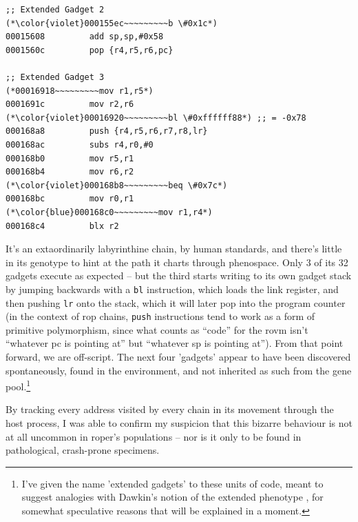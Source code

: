 \documentclass[12pt,glossary]{dalthesis}
\begin{document}
\begin{table}
\begin{multicols}{2}
\begin{lstlisting}[basicstyle=\scriptsize\ttfamily]
;; Extended Gadget 2 
(*\color{violet}000155ec~~~~~~~~~b \#0x1c*)
00015608         add sp,sp,#0x58 
0001560c         pop {r4,r5,r6,pc}

;; Extended Gadget 3 
(*00016918~~~~~~~~~mov r1,r5*) 
0001691c         mov r2,r6 
(*\color{violet}00016920~~~~~~~~~bl \#0xffffff88*) ;; = -0x78
000168a8         push {r4,r5,r6,r7,r8,lr} 
000168ac         subs r4,r0,#0 
000168b0         mov r5,r1 
000168b4         mov r6,r2 
(*\color{violet}000168b8~~~~~~~~~beq \#0x7c*)
000168bc         mov r0,r1 
(*\color{blue}000168c0~~~~~~~~~mov r1,r4*)
000168c4         blx r2
\end{lstlisting}
\end{multicols}
\caption{Execution trace of a chain that generates the register pattern required for a call to \texttt{execv("/bin/sh", ["/bin/sh"], NULL)} in \texttt{tomato-RT-N18U-httpd}, by modifying its own call stack and executing numerous "stray" or "extended" gadgets, in the \emph{poclux} population. Modifications to the gadget stack are in red, jumps are in violet, and completion of target \gls{cpu} pattern is in blue. Free branches are separated by blank lines. The final instruction jumps to the designated stop address, \texttt{0x00000000}.}
\end{table} 

It's an extaordinarily labyrinthine chain, by human standards, and there's
 little in its genotype to hint at the path it charts through phenospace. Only 3
 of its 32 gadgets execute as expected -- but the third starts writing to its own
 gadget stack by jumping backwards with a \texttt{bl} instruction, which loads the link
 register, and then pushing \texttt{lr} onto the stack, which it will later pop into the
 program counter (in the context of \gls{rop} chains, \texttt{push} instructions tend to work
as a form of primitive polymorphism, since what counts as ``code'' for the \gls{rovm} 
isn't ``whatever \gls{pc} is pointing at'' but ``whatever \gls{sp} is pointing at''). From that point forward, we are off-script. The next four
 'gadgets' appear to have been discovered spontaneously, found in the
 environment, and not inherited as such from the gene pool.\footnote{I've given the name 'extended gadgets' to these units of code, meant to suggest
 analogies with Dawkin's notion of the extended phenotype \cite{dawkins99}, for
 somewhat speculative reasons that will be explained in a moment.}

By tracking every address visited by every chain in
its movement through the host process, I was able to confirm my suspicion
that this bizarre behaviour is not at all uncommon in \gls{roper}'s populations
-- nor is it only to be found in pathological, crash-prone specimens. 
\end{document}
